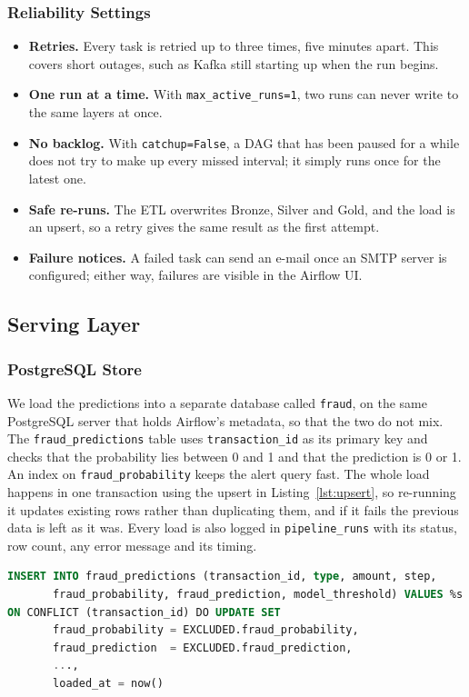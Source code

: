 \documentclass[11pt,a4paper]{article}
\newcommand{\code}[1]{\texttt{#1}}
\begin{document}
\subsubsection{Reliability Settings}
\begin{itemize}
  \item \textbf{Retries.} Every task is retried up to three times, five minutes
        apart. This covers short outages, such as Kafka still starting up when
        the run begins.
  \item \textbf{One run at a time.} With \code{max\_active\_runs=1}, two runs can
        never write to the same layers at once.
  \item \textbf{No backlog.} With \code{catchup=False}, a DAG that has been paused
        for a while does not try to make up every missed interval; it simply runs
        once for the latest one.
  \item \textbf{Safe re-runs.} The ETL overwrites Bronze, Silver and Gold, and the
        load is an upsert, so a retry gives the same result as the first attempt.
  \item \textbf{Failure notices.} A failed task can send an e-mail once an SMTP
        server is configured; either way, failures are visible in the Airflow UI.
\end{itemize}

\subsection{Serving Layer}

\subsubsection{PostgreSQL Store}
We load the predictions into a separate database called \code{fraud}, on the same
PostgreSQL server that holds Airflow's metadata, so that the two do not mix. The
\code{fraud\_predictions} table uses \code{transaction\_id} as its primary key and
checks that the probability lies between 0 and 1 and that the prediction is 0 or
1. An index on \code{fraud\_probability} keeps the alert query fast. The whole
load happens in one transaction using the upsert in Listing~\ref{lst:upsert}, so
re-running it updates existing rows rather than duplicating them, and if it fails
the previous data is left as it was. Every load is also logged in
\code{pipeline\_runs} with its status, row count, any error message and its
timing.

\begin{lstlisting}[language=SQL,caption={Idempotent load into the serving table (abridged)},label={lst:upsert}]
INSERT INTO fraud_predictions (transaction_id, type, amount, step,
       fraud_probability, fraud_prediction, model_threshold) VALUES %s
ON CONFLICT (transaction_id) DO UPDATE SET
       fraud_probability = EXCLUDED.fraud_probability,
       fraud_prediction  = EXCLUDED.fraud_prediction,
       ...,
       loaded_at = now()
\end{lstlisting}
\end{document}
